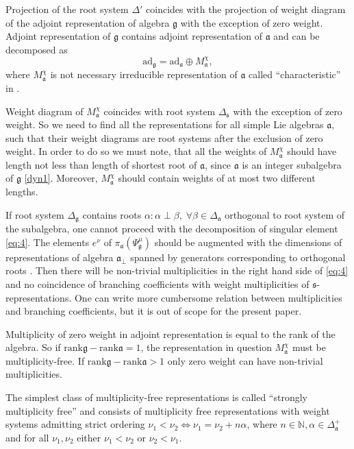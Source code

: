 \documentclass{article}
\newcommand{\pia}{\pi_{\mathfrak{a}}}
\newcommand{\gf}{\mathfrak{g}}
\newcommand{\af}{\mathfrak{a}}
\newcommand{\afb}{\mathfrak{a}_{\bot}}
\newcommand{\sfr}{\mathfrak{s}}
\begin{document}
Projection of the root system $\Delta'$ coincides with the projection of weight diagram of the
adjoint representation of algebra $\gf$ with the exception of zero weight. Adjoint representation of
$\gf$ contains adjoint representation of $\af$ and can be decomposed as
\begin{equation}
  \label{eq:3}
  \mathrm{ad}_{\gf}=\mathrm{ad}_{\af}\oplus M_{\af}^{\chi},
\end{equation}
where $M^{\chi}_{\af}$ is not necessary irreducible representation of $\af$ called
``characteristic'' in \cite{dynkin1952semisimple}. 

Weight diagram of $M^{\chi}_{\af}$ coincides with root system $\Delta_{\sfr}$ with the exception of
zero weight. So we need to find all the representations for all simple Lie algebras $\af$, such that
their weight diagrams are root systems after the exclusion of zero weight. In order to do so we must
note, that all the weights of $M^{\chi}_{\af}$ should have length not less than length of shortest
root of $\af$, since $\af$ is an integer subalgebra of $\gf$ \ref{dyn1}. Moreover, $M^{\chi}_{\af}$
should contain weights of at most two different lengths. 

If root system $\Delta_{\gf}$ contains roots $\alpha: \alpha\perp \beta,\; \forall \beta\in
\Delta_{\af}$ orthogonal to root system of the subalgebra, one cannot proceed with the decomposition
of singular element \eqref{eq:4}. The elements $e^{\nu}$ of $\pia\left(\Psi^{\mu}_{\gf}\right)$
should be augmented with the dimensions of representations of algebra $\afb$ spanned by generators
corresponding to orthogonal roots \cite{2010arXiv1007.0318L}. Then there will be non-trivial
multiplicities in the right hand side of \eqref{eq:4} and no coincidence of branching coefficients
with weight multiplicities of $\sfr$-representations. One can write more cumbersome relation between
multiplicities and branching coefficients, but it is out of scope for the present paper.

Multiplicity of zero weight in adjoint representation is equal to the rank of the algebra. So if
$\mathrm{rank}\gf-\mathrm{rank}\af=1$, the representation in question $M^{\chi}_{\af}$ must be
multiplicity-free. If $\mathrm{rank}\gf-\mathrm{rank}\af>1$ only zero weight can have non-trivial
multiplicities. 

The simplest class of multiplicity-free representations is called ``strongly multiplicity free''
\cite{lehrer2006strongly} and consists of multiplicity free representations with weight systems
admitting strict ordering $\nu_{1}<\nu_{2} \Leftrightarrow \nu_{1}=\nu_{2}+n \alpha$, where $n\in
\mathbb{N}, \alpha\in \Delta^{+}_{\af}$ and for all $\nu_{1},\nu_{2}$ either $\nu_{1}<\nu_{2}$ or
$\nu_{2}<\nu_{1}$.
\end{document}
